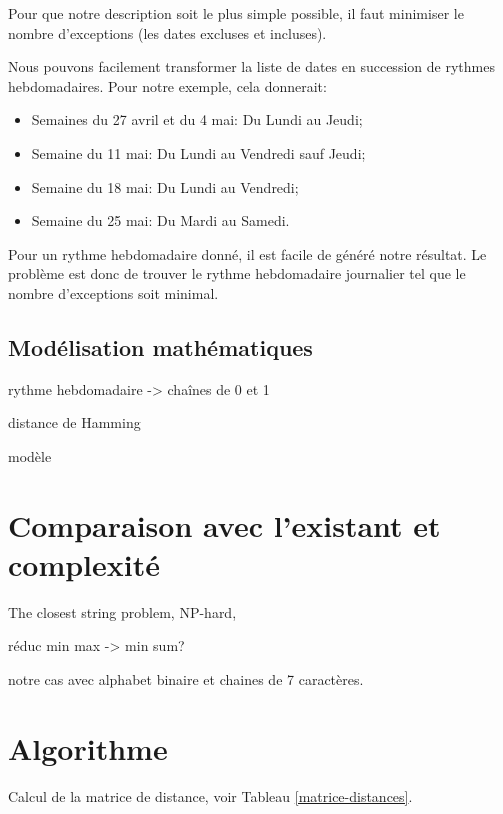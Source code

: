 \documentclass{roadef}
\begin{document}
Pour que notre description soit le plus simple possible, il faut
minimiser le nombre d'exceptions (les dates excluses et incluses).

Nous pouvons facilement transformer la liste de dates en succession de
rythmes hebdomadaires. Pour notre exemple, cela donnerait:
\begin{itemize}
\item Semaines du 27 avril et du 4 mai: Du Lundi au Jeudi;
\item Semaine du 11 mai: Du Lundi au Vendredi sauf Jeudi;
\item Semaine du 18 mai: Du Lundi au Vendredi;
\item Semaine du 25 mai: Du Mardi au Samedi.
\end{itemize}

Pour un rythme hebdomadaire donné, il est facile de généré notre
résultat.  Le problème est donc de trouver le rythme hebdomadaire
journalier tel que le nombre d'exceptions soit minimal.

\subsection{Modélisation mathématiques}

rythme hebdomadaire -> chaînes de 0 et 1

distance de Hamming

modèle

\section{Comparaison avec l'existant et complexité}

The closest string problem, NP-hard, \cite{lanctot2003distinguishing}

réduc min max -> min sum?

notre cas avec alphabet binaire et chaines de 7 caractères.

\section{Algorithme}

Calcul de la matrice de distance, voir Tableau \ref{matrice-distances}.
\end{document}
